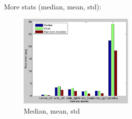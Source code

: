 More stats (median, mean, std):
\begin{figure}[!htbp]
 \centering
 \includegraphics[width=0.5\textwidth]{images/stats.pdf}
 \caption{Median, mean, std}
 \label{fig:stats}
\end{figure}





